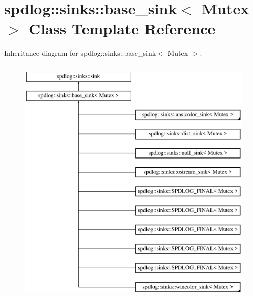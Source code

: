 \hypertarget{classspdlog_1_1sinks_1_1base__sink}{}\section{spdlog\+:\+:sinks\+:\+:base\+\_\+sink$<$ Mutex $>$ Class Template Reference}
\label{classspdlog_1_1sinks_1_1base__sink}
Inheritance diagram for spdlog\+:\+:sinks\+:\+:base\+\_\+sink$<$ Mutex $>$\+:\begin{figure}[H]
\begin{center}
\leavevmode
\includegraphics[height=12.000000cm]{classspdlog_1_1sinks_1_1base__sink}
\end{center}
\end{figure}

